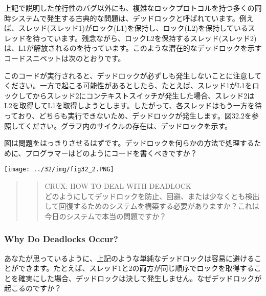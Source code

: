 上記で説明した並行性のバグ以外にも、複雑なロックプロトコルを持つ多くの同時システムで発生する古典的な問題は、デッドロックと呼ばれています。例えば、スレッド(スレッド1)がロック(L1)を保持し、ロック(L2)を保持しているスレッドを待っています。残念ながら、ロックL2を保持するスレッド(スレッド2)は、L1が解放されるのを待っています。このような潜在的なデッドロックを示すコードスニペットは次のとおりです。

\begin{Shaded}
\begin{Highlighting}[]
\NormalTok{:}
\end{Highlighting}
\end{Shaded}

このコードが実行されると、デッドロックが必ずしも発生しないことに注意してください。一方で起こる可能性があるとしたら、たとえば、スレッド1がL1をロックしてからスレッド2にコンテキストスイッチが発生した場合、スレッド2はL2を取得してL1を取得しようとします。したがって、各スレッドはもう一方を待っており、どちらも実行できないため、デッドロックが発生します。図32.2を参照してください。グラフ内のサイクルの存在は、デッドロックを示す。

図は問題をはっきりさせるはずです。デッドロックを何らかの方法で処理するために、プログラマーはどのようにコードを書くべきですか？

\texttt{[image: ../32/img/fig32\_2.PNG]}

\begin{quote}
\begin{quote}
CRUX: HOW TO DEAL WITH DEADLOCK\\
どのようにしてデッドロックを防止、回避、または少なくとも検出して回復するためのシステムを構築する必要がありますか？これは今日のシステムで本当の問題ですか？
\end{quote}
\end{quote}

\hypertarget{why-do-deadlocks-occur}{%
\subsubsection*{Why Do Deadlocks Occur?}\label{why-do-deadlocks-occur}}

あなたが思っているように、上記のような単純なデッドロックは容易に避けることができます。たとえば、スレッド1と2の両方が同じ順序でロックを取得することを確実にした場合、デッドロックは決して発生しません。なぜデッドロックが起こるのですか？

